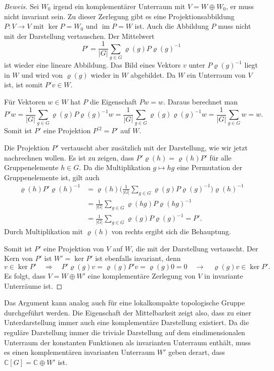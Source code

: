 \begin{proof}[Beweis]
Sei $W_0$ irgend ein komplementärer Unterraum mit $V=W\oplus W_0$, er muss
nicht invariant sein.
Zu dieser Zerlegung gibt es eine Projektionsabbildung $P\colon V\to V$ mit
$\operatorname{ker}P=W_0$ und $\operatorname{im}P=W$ ist.
Auch die Abbildung $P$ muss nicht mit der Darstellung vertauschen.
Der Mittelwert 
\[
P'
=
\frac{1}{|G|}
\sum_{g\in G}
\varrho(g) P \varrho(g)^{-1}
\]
ist wieder eine lineare Abbildung.
Das Bild eines Vektors $v$ unter $P\varrho(g)^{-1}$ liegt in $W$ und wird
von $\varrho(g)$ wieder in $W$ abgebildet.
Da $W$ ein Unterraum von $V$ ist, ist somit $P'v\in W$.

Für Vektoren $w\in W$ hat $P$ die Eigenschaft $Pw=w$.
Daraus berechnet man
\[
P'w
=
\frac{1}{|G|}
\sum_{g\in G}
\varrho(g) P\varrho(g)^{-1}w
=
\frac{1}{|G|}
\sum_{g\in G}
\varrho(g) \varrho(g)^{-1}w
=
\frac{1}{|G|}
\sum_{g\in G}
w
=
w.
\]
Somit ist $P'$ eine Projektion $P^{\prime 2}=P'$ auf $W$.

Die Projektion $P'$ vertauscht aber zusätzlich mit der Darstellung, wie
wir jetzt nachrechnen wollen.
Es ist zu zeigen, dass $P'\varrho(h) = \varrho(h)P'$ für alle
Gruppenelemente $h\in G$.
Da die Multiplikation $g\mapsto hg$ eine Permutation der Gruppenelemente
ist, gilt auch
\begin{align*}
\varrho(h)P'\varrho(h)^{-1}
&=
\varrho(h)
\biggl(\frac{1}{|G|}\sum_{g\in G} \varrho(g)P\varrho(g)^{-1}\biggr)
\varrho(h)^{-1}
\\
&=
\frac{1}{|G|}
\sum_{g\in G} \varrho(hg)P\varrho(hg)^{-1}
\\
&=
\frac{1}{|G|}
\sum_{g\in G} \varrho(g)P\varrho(g)^{-1}
=
P'.
\end{align*}
Durch Multiplikation mit $\varrho(h)$ von rechts ergibt sich die Behauptung.

Somit ist $P'$ eine Projektion von $V$ auf $W$, die mit der Darstellung
vertauscht.
Der Kern von $P'$ ist $W'=\ker P'$ ist ebenfalls invariant, denn
\[
v\in\ker P'
\quad\Rightarrow\quad
P'
\varrho(g)v
=
\varrho(g)P'v
=
\varrho(g)0
=
0
\quad\rightarrow\quad
\varrho(g)v
\in \ker P'.
\]
Es folgt, dass $V=W\oplus W'$ eine komplementäre Zerlegung von $V$ in
invariante Unterräume ist.
\end{proof}

Das Argument kann analog auch für eine lokalkompakte topologische Gruppe
durchgeführt werden.
Die Eigenschaft der Mittelbarkeit zeigt also, dass zu einer Unterdarstellung
immer auch eine komplementäre Darstellung existiert.
Da die reguläre Darstellung immer die triviale Darstellung auf dem
eindimensionalen Unterraum der konstanten Funktionen als invarianten
Unterraum enthält, muss es einen komplementären invarianten Unterraum $W'$
geben derart, dass $\mathbb{C}[G]=\mathbb{C}\oplus W'$ ist.

